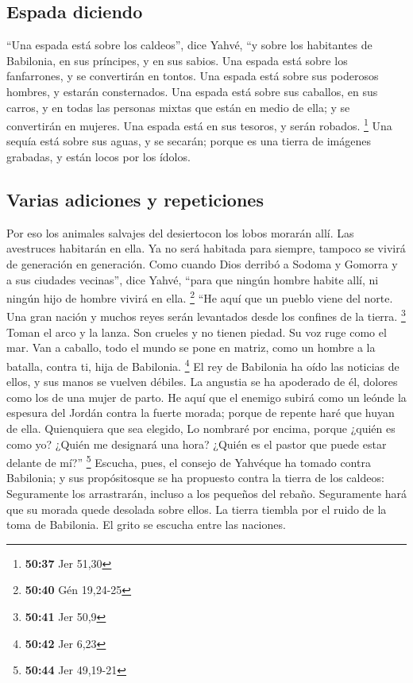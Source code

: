 \hypertarget{espada-diciendo}{%
\subsection{Espada diciendo}\label{espada-diciendo}}

 ``Una espada está sobre los caldeos'', dice Yahvé, ``y
sobre los habitantes de Babilonia, en sus príncipes, y en sus sabios.
 Una espada está sobre los fanfarrones, y se convertirán
en tontos. Una espada está sobre sus poderosos hombres, y estarán
consternados.  Una espada está sobre sus caballos, en sus
carros, y en todas las personas mixtas que están en medio de ella; y se
convertirán en mujeres. Una espada está en sus tesoros, y serán robados.
\footnote{\textbf{50:37} Jer 51,30}  Una sequía está
sobre sus aguas, y se secarán; porque es una tierra de imágenes
grabadas, y están locos por los ídolos.

\hypertarget{varias-adiciones-y-repeticiones}{%
\subsection{Varias adiciones y
repeticiones}\label{varias-adiciones-y-repeticiones}}

 Por eso los animales salvajes del desiertocon los lobos
morarán allí. Las avestruces habitarán en ella. Ya no será habitada para
siempre, tampoco se vivirá de generación en generación. 
Como cuando Dios derribó a Sodoma y Gomorra y a sus ciudades vecinas'',
dice Yahvé, ``para que ningún hombre habite allí, ni ningún hijo de
hombre vivirá en ella. \footnote{\textbf{50:40} Gén 19,24-25}
 ``He aquí que un pueblo viene del norte. Una gran nación
y muchos reyes serán levantados desde los confines de la tierra.
\footnote{\textbf{50:41} Jer 50,9}  Toman el arco y la
lanza. Son crueles y no tienen piedad. Su voz ruge como el mar. Van a
caballo, todo el mundo se pone en matriz, como un hombre a la batalla,
contra ti, hija de Babilonia. \footnote{\textbf{50:42} Jer 6,23}
 El rey de Babilonia ha oído las noticias de ellos, y sus
manos se vuelven débiles. La angustia se ha apoderado de él, dolores
como los de una mujer de parto.  He aquí que el enemigo
subirá como un leónde la espesura del Jordán contra la fuerte morada;
porque de repente haré que huyan de ella. Quienquiera que sea elegido,
Lo nombraré por encima, porque ¿quién es como yo? ¿Quién me designará
una hora? ¿Quién es el pastor que puede estar delante de mí?''
\footnote{\textbf{50:44} Jer 49,19-21}  Escucha, pues, el
consejo de Yahvéque ha tomado contra Babilonia; y sus propósitosque se
ha propuesto contra la tierra de los caldeos: Seguramente los
arrastrarán, incluso a los pequeños del rebaño. Seguramente hará que su
morada quede desolada sobre ellos.  La tierra tiembla por
el ruido de la toma de Babilonia. El grito se escucha entre las
naciones.

